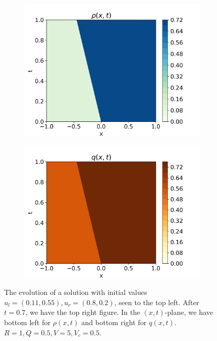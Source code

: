 \documentclass[10pt]{article}
\numberwithin{equation}{section}
\begin{document}
\begin{figure}[H]
\begin{subfigure}[b]{0.35\textwidth}
         \includegraphics[width=\textwidth]{Figures/Model/Sys2aRho.png}
     \end{subfigure}
     \begin{subfigure}[b]{0.35\textwidth}
         \centering
         \includegraphics[width=\textwidth]{Figures/Model/Sys2aQ.png}
     \end{subfigure}
        \caption{The evolution of a solution with initial values $u_l = (0.11, 0.55), u_r = (0.8, 0.2)$, seen to the top left. After $t = 0.7$, we have the top right figure. In the $(x,t)$-plane, we have bottom left for $\rho(x,t)$ and bottom right for $q(x,t)$. 
        $R = 1, Q = 0.5, V = 5, V_c = 0.5$.}
        \label{fig:Example2a}
\end{figure}
\end{document}
